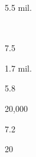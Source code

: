 \begin{description}[font=\normalfont,style=nextline]
\begin{multicols}{2}
\begin{description}[font=\normalfont\itshape,noitemsep]
 \item[]
\item[\nativespeakers] 5.5 mil. 
 \item[\region] \regionWSumatra\ \Brackets{\regionIndonesia} 
 \end{description}\end{multicols}
\item[\langnameMundari] 
 \begin{multicols}{2}\begin{description}[font=\normalfont\itshape,noitemsep] 
 \item[] 
 \item[\pbnumberabbr] 7.5 
 \item[\family] \famAustroasiatic 
 \item[]
\item[\nativespeakers] 1.7 mil. 
 \item[\region] \regionIndia\EnumComma\regionBangladesh\EnumComma\regionNepal 
 \end{description}\end{multicols}
\item[\langnameNasioi] 
 \begin{multicols}{2}\begin{description}[font=\normalfont\itshape,noitemsep] 
 \item[] 
 \item[\pbnumberabbr] 5.8 
 \item[\family] \famSBougainville 
 \item[]
\item[\nativespeakers] 20,000 
 \item[\region] \regionPNG 
 \end{description}\end{multicols}
\item[\langnameNezPerce] 
 \begin{multicols}{2}\begin{description}[font=\normalfont\itshape,noitemsep] 
 \item[] 
 \item[\pbnumberabbr] 7.2 
 \item[\family] \famPenutian 
 \item[]
\item[\nativespeakers] 20 
 \item[\region] \regionIdaho\ \Brackets{\regionUSA}
 \end{description}\end{multicols}
\item[\langnameNgombe] 

\end{description}
